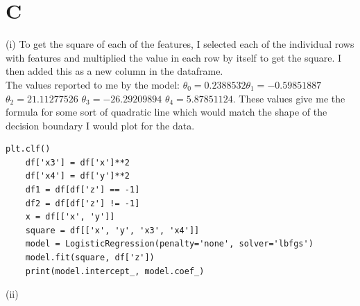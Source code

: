 \documentclass[10pt,a4paper]{article}
\begin{document}
\section{C}
(i)
To get the square of each of the features, I selected each of the individual rows with features and multiplied the value in each row by itself to get the square. I then added this as a new column in the dataframe.\\
The values reported to me by the model:  \(\theta_0 = 0.2388532  \theta_1 =-0.59851887  \) \(\theta_2 =  21.11277526 \) \( \theta_3= -26.29209894\) \(\theta_4 = 5.87851124 \). These values give me the formula for some sort of quadratic line which would match the shape of the decision boundary I would plot for the data.
\begin{verbatim}
plt.clf()
    df['x3'] = df['x']**2
    df['x4'] = df['y']**2
    df1 = df[df['z'] == -1]
    df2 = df[df['z'] != -1]
    x = df[['x', 'y']]
    square = df[['x', 'y', 'x3', 'x4']]
    model = LogisticRegression(penalty='none', solver='lbfgs')
    model.fit(square, df['z'])
    print(model.intercept_, model.coef_)
\end{verbatim}
(ii)
\begin{figure}[h]
\centering
{}
\qquad
{}
\end{figure}
\end{document}
